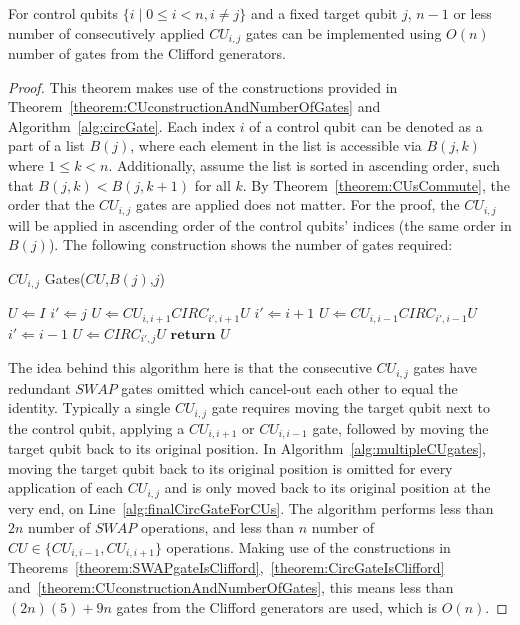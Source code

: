\begin{theorem}
\label{theorem:multipleCuGates}
For control qubits $\{i \mid 0 \leq i < n, i \neq j\}$ and a fixed target qubit $j$, $n-1$ or less number of consecutively applied $\mathit{CU}_{i,j}$ gates can be implemented using $O \left(n \right)$ number of gates from the Clifford generators.
\end{theorem}
\begin{proof}
This theorem makes use of the constructions provided in Theorem~\ref{theorem:CUconstructionAndNumberOfGates} and Algorithm~\ref{alg:circGate}. Each index $i$ of a control qubit can be denoted as a part of a list $B(j)$, where each element in the list is accessible via $B(j,k)$ where $1 \leq k < n$. Additionally, assume the list is sorted in ascending order, such that $B(j,k) < B(j,k+1)$ for all $k$. By Theorem~\ref{theorem:CUsCommute}, the order that the $\mathit{CU}_{i,j}$ gates are applied does not matter. For the proof, the $\mathit{CU}_{i,j}$ will be applied in ascending order of the control qubits' indices (the same order in $B(j)$). The following construction shows the number of gates required:
\begin{algorithm}[H]
  \caption{$\mathit{CU}_{i,j}$ Gates($\mathit{CU}$,$B(j)$,$j$)}  \label{alg:multipleCUgates}
  \begin{algorithmic}[1]
  \State $U \Longleftarrow I$
  \State $i' \Longleftarrow j$
    \State $U \Longleftarrow \mathit{CU}_{i,i+1}\mathit{CIRC}_{i',i+1}U$
    \State $i' \Longleftarrow i+1$
  \EndFor
    \State $U \Longleftarrow \mathit{CU}_{i,i-1}\mathit{CIRC}_{i',i-1}U$
    \State $i' \Longleftarrow i-1$
  \EndFor
  \State $U \Longleftarrow \mathit{CIRC}_{i',j}U$ \label{alg:finalCircGateForCUs}
  \State $\mathbf{return}$ $U$
  \end{algorithmic}
\end{algorithm}
The idea behind this algorithm here is that the consecutive $\mathit{CU}_{i,j}$ gates have redundant $\mathit{SWAP}$ gates omitted which cancel-out each other to equal the identity. Typically a single $\mathit{CU}_{i,j}$ gate requires moving the target qubit next to the control qubit, applying a $\mathit{CU}_{i,i+1}$ or $\mathit{CU}_{i,i-1}$ gate, followed by moving the target qubit back to its original position. In Algorithm~\ref{alg:multipleCUgates}, moving the target qubit back to its original position is omitted for every application of each $\mathit{CU}_{i,j}$ and is only moved back to its original position at the very end, on Line~\ref{alg:finalCircGateForCUs}. The algorithm performs less than $2n$ number of $\mathit{SWAP}$ operations, and less than $n$ number of $\mathit{CU} \in \{\mathit{CU}_{i,i-1}, \mathit{CU}_{i,i+1}\}$ operations. Making use of the constructions in Theorems~\ref{theorem:SWAPgateIsClifford},~\ref{theorem:CircGateIsClifford} and~\ref{theorem:CUconstructionAndNumberOfGates}, this means less than $(2n)(5) + 9n$ gates from the Clifford generators are used, which is $O \left(n \right)$.
\end{proof}

